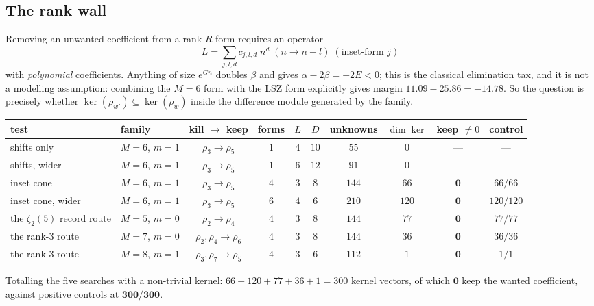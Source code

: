 \subsection{The rank wall}\label{ss:rank}

Removing an unwanted coefficient from a rank-$R$ form requires an operator
\begin{equation}\label{eq:operator}
 L=\sum_{j,l,d}c_{j,l,d}\;n^d\;(n\to n+l)\;(\text{inset-form }j)
\end{equation}
with \emph{polynomial} coefficients. Anything of size $e^{Gn}$ doubles $\beta$ and gives
$\alpha-2\beta=-2E<0$; this is the classical elimination tax, and it is not a modelling
assumption: combining the $M=6$ form with the LSZ form explicitly gives margin
$11.09-25.86=-14.78$. So the question is precisely whether
$\ker(\rho_{w'})\subseteq\ker(\rho_w)$ inside the difference module generated by the family.

\begin{finding}\label{find:rankwall}
\begin{center}
\tabsmall
\begin{tabular}{llcccccccc}
\toprule
test & family & kill $\to$ keep & forms & $L$ & $D$ & unknowns & $\dim\ker$ & keep $\ne0$ & control\\
\midrule
shifts only & $M{=}6$, $m{=}1$ & $\rho_3\to\rho_5$ & $1$ & $4$ & $10$ & $55$ & $0$ & --- & ---\\
shifts, wider & $M{=}6$, $m{=}1$ & $\rho_3\to\rho_5$ & $1$ & $6$ & $12$ & $91$ & $0$ & --- & ---\\
inset cone & $M{=}6$, $m{=}1$ & $\rho_3\to\rho_5$ & $4$ & $3$ & $8$ & $144$ & $66$ & $\mathbf 0$ & $66/66$\\
inset cone, wider & $M{=}6$, $m{=}1$ & $\rho_3\to\rho_5$ & $6$ & $4$ & $6$ & $210$ & $120$ & $\mathbf 0$ & $120/120$\\
the $\zeta_2(5)$ record route & $M{=}5$, $m{=}0$ & $\rho_2\to\rho_4$ & $4$ & $3$ & $8$ & $144$ & $77$ & $\mathbf 0$ & $77/77$\\
the rank-$3$ route & $M{=}7$, $m{=}0$ & $\rho_2,\rho_4\to\rho_6$ & $4$ & $3$ & $8$ & $144$ & $36$ & $\mathbf 0$ & $36/36$\\
the rank-$3$ route & $M{=}8$, $m{=}1$ & $\rho_3,\rho_7\to\rho_5$ & $4$ & $3$ & $6$ & $112$ & $1$ & $\mathbf 0$ & $1/1$\\
\bottomrule
\end{tabular}
\end{center}
Totalling the five searches with a non-trivial kernel: $66+120+77+36+1=300$ kernel vectors,
of which $\mathbf{0}$ keep the wanted coefficient, against positive controls at
$\mathbf{300/300}$.
\end{finding}


